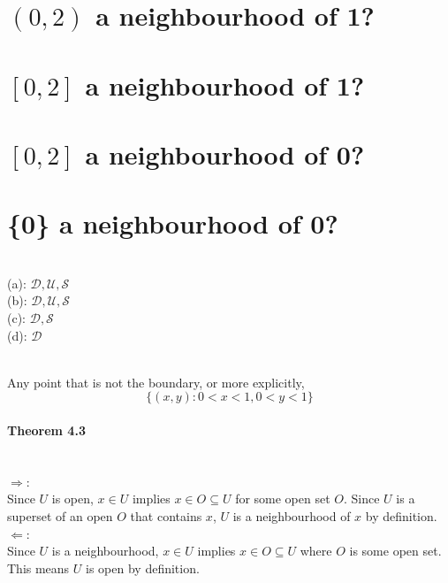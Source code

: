 \begin{parts}
 
 \part{$(0,2)$ a neighbourhood of 1?}
 
 \part{$[0,2]$ a neighbourhood of 1?}
 
 \part{$[0,2]$ a neighbourhood of 0?}
 
 \part{\{0\} a neighbourhood of 0?}
 
 
\begin{solution}
 \\(a): $\mathcal{D}, \mathcal{U}, \mathcal{S}$ \\
 (b): $\mathcal{D}, \mathcal{U}, \mathcal{S}$ \\
 (c): $\mathcal{D}, \mathcal{S}$ \\
 (d): $\mathcal{D}$ \\
\end{solution}
\end{parts}


\begin{solution}
 \\Any point that is not the boundary, or more explicitly,
 $$\{(x,y):0 < x < 1, 0 < y < 1\}$$
\end{solution}

\subsection{Theorem 4.3}
\setcounter{question}{0}


\begin{solution}
 \\$\Rightarrow$: \\
 Since $U$ is open, $x \in U$ implies $x \in O \subseteq U$ for some open set $O$. Since $U$ is a superset of an open $O$ that contains $x$, $U$ is a neighbourhood of $x$ by definition. \\
 $\Leftarrow$: \\
 Since $U$ is a neighbourhood, $x \in U$ implies $x \in O \subseteq U$ where $O$ is some open set. This means $U$ is open by definition.
\end{solution}

